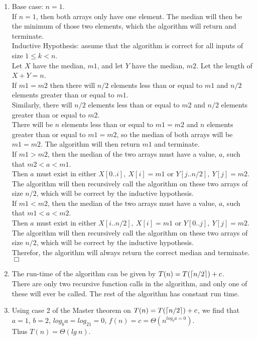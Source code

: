 \documentclass{assignment}
\DeclarePairedDelimiter\ceil{\lceil}{\rceil}
\begin{document}
\begin{problemlist}
\begin{answer}
\begin{enumerate}
\begin{algorithm}
{  }
  \Indm
  \}
\end{algorithm}
\DecMargin{3em}
\item
Base case: $n=1$.\\
If $n=1$, then both arrays only have one element. The median will then be the minimum of those two elements, which the algorithm will return and terminate.\\
Inductive Hypothesis: assume that the algorithm is correct for all inputs of size $1 \le k < n$.\\
Let $X$ have the median, $m1$, and let $Y$ have the median, $m2$. Let the length of $X + Y = n$.\\
If $m1 = m2$ then there will $n/2$ elements less than or equal to $m1$ and $n/2$ elements greater than or equal to $m1$.\\
Similarly, there will $n/2$ elements less than or equal to $m2$ and $n/2$ elements greater than or equal to $m2$.\\
There will be $n$ elements less than or equal to $m1=m2$ and $n$ elements greater than or equal to $m1=m2$, so the median of both arrays will be $m1=m2$. The algorithm will then return $m1$ and terminate.\\
If $m1 > m2$, then the median of the two arrays must have a value, $a$, such that $m2 < a < m1$.\\
Then $a$ must exist in either $X[0..i],~X[i]=m1$ or $Y[j..n/2],~Y[j]=m2$.\\
The algorithm will then recursively call the algorithm on these two arrays of size $n/2$, which will be correct by the inductive hypothesis.\\
If $m1 < m2$, then the median of the two arrays must have a value, $a$, such that $m1 < a < m2$.\\
Then $a$ must exist in either $X[i..n/2],~X[i]=m1$ or $Y[0..j],~Y[j]=m2$.\\
The algorithm will then recursively call the algorithm on these two arrays of size $n/2$, which will be correct by the inductive hypothesis.\\
Therefor, the algorithm will always return the correct median and terminate. $\Box$\\
\item
The run-time of the algorithm can be given by $T(n) = T(\ceil{n/2}) + c$.\\
There are only two recursive function calls in the algorithm, and only one of these will ever be called. The rest of the algorithm has constant run time.\\
\item
Using case 2 of the Master theorem on $T(n) = T(\ceil{n/2}) + c$, we find that $a=1$, $b=2$, $log_ba=log_21=0$, $f(n)=c=\Theta (n^{log_ba=0})$.\\
Thus $T(n) = \Theta (lg~n)$.\\
\end{enumerate}
\end{answer}

\end{problemlist}
\end{document}
